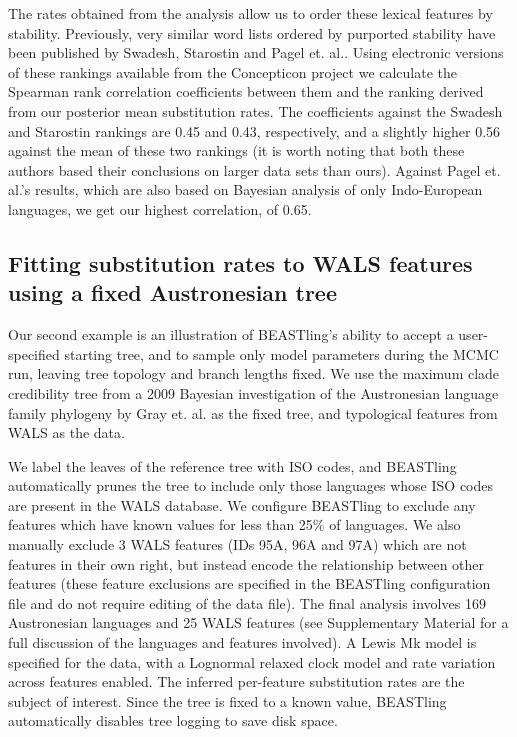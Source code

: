 \documentclass[twocolumn,10pt]{scrartcl}
\begin{document}
The rates obtained from the analysis allow us to order these lexical features by stability.
Previously, very similar word lists ordered by purported stability have been published by Swadesh\cite{Swadesh1955}, Starostin\cite{Starostin2007} and Pagel et. al.\cite{Pagel2007}.
Using electronic versions of these rankings available from the Concepticon project\cite{List2015} we calculate the Spearman rank correlation coefficients between them and the ranking derived from our posterior mean substitution rates. The coefficients against the Swadesh and Starostin rankings are 0.45 and 0.43, respectively, and a slightly higher 0.56 against the mean of these two rankings (it is worth noting that both these authors based their conclusions on larger data sets than ours).  Against Pagel et. al.'s results, which are also based on Bayesian analysis of only Indo-European languages, we get our highest correlation, of 0.65.

\subsection{Fitting substitution rates to WALS features using a fixed Austronesian tree}

Our second example is an illustration of BEASTling's ability to accept a user-specified starting tree, and to sample only model parameters during the MCMC run, leaving tree topology and branch lengths fixed.  We use the maximum clade credibility tree from a 2009 Bayesian investigation of the Austronesian language family phylogeny by Gray et. al.\cite{Gray2009} as the fixed tree, and typological features from WALS \cite{Dryer2013} as the data.

We label the leaves of the reference tree with ISO codes, and BEASTling automatically prunes the tree to include only those languages whose ISO codes are present in the WALS database.  We configure BEASTling to exclude any features which have known values for less than 25\% of languages.  We also manually exclude 3 WALS features (IDs 95A, 96A and 97A) which are not features in their own right, but instead encode the relationship between other features (these feature exclusions are specified in the BEASTling configuration file and do not require editing of the data file).  The final analysis involves 169 Austronesian languages and 25 WALS features (see Supplementary Material for a full discussion of the languages and features involved).  A Lewis Mk model is specified for the data, with a Lognormal relaxed clock model and rate variation across features enabled.  The inferred per-feature substitution rates are the subject of interest.  Since the tree is fixed to a known value, BEASTling automatically disables tree logging to save disk space.
\end{document}
